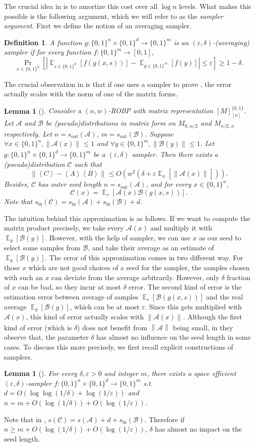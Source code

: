 \documentclass[10pt,a4paper]{article}
\newtheorem{definition}[theorem]{Definition}
\newtheorem{lemma}[theorem]{Lemma}
\DeclareMathOperator*{\Ex}{\mathbb E}
\newcommand{\ex}[2][]{\Ex_{#1}\left[#2\right]}
\newcommand{\pr}[2][]{\Pr_{#1}\left[#2\right]}
\newcommand{\abs}[1]{\left|#1\right|}
\newcommand{\inp}[1]{\left\langle#1\right\rangle}
\newcommand{\norm}[2][]{\left\|#2\right\|_{#1}}
\newcommand{\cA}{\mathcal A}
\newcommand{\cB}{\mathcal B}
\newcommand{\cC}{\mathcal C}
\newcommand{\bits}[1]{\{0,1\}^{#1}}
\newcommand{\bit}{\{0,1\}}
\newcommand{\eps}{\varepsilon}
\newcommand{\sout}[1][]{s_{\mathrm{out}#1}}
\newcommand{\si}[1][]{s_{\mathrm{in}#1}}
\begin{document}
The crucial idea in \cite{BCG18} is to amortize this cost over all $\log n$ levels. What makes this possible is the following argument, which we will refer to as the \emph{sampler argument}. First we define the notion of an averaging sampler. 
\begin{definition}
A function $g:\bits{n}\times\bits{d}\to\bits{m}$ is an $(\eps,\delta)$-(averaging) sampler if for every function $f:\bits{m}\to{[0,1]}$, $$\pr[x\in\bits{n}]{\abs{\ex[s\in\bits{d}]{f(g(x,s))}-\ex[y\in\bits{m}]{f(y)}}\le\eps}\ge 1-\delta.$$
\end{definition}
\noindent
The crucial observation in \cite{BCG18} is that if one uses a sampler to prove , the error actually scales with the norm of one of the matrix forms.
\begin{lemma}[\cite{BCG18}]\label{lemma:samp-arg}
Consider a $(n,w)$-ROBP with matrix representation $[M]_{[n]}^{\bit}$. Let $\cA$ and $\cB$ be (pseudo)distributions in matrix form on $M_{0..n/2}$ and $M_{n/2..n}$ respectively. Let $n=\sout(\cA)$, $m=\sout(\cB)$. Suppose $\forall x\in\bits{n},\norm{\cA(x)}\le 1$ and $\forall y\in\bits{m},\norm{\cB(y)}\le 1$. Let $g:\bits{n}\times \bits{d}\to\bits{m}$ be a $(\eps,\delta)$ sampler. Then there exists a (pseudo)distribution $\cC$ such that 
$$\norm{\inp{C}-\inp{A}\inp{B}}\le O\left(w^2\left(\delta+\eps \ex[x]{\norm{\cA(x)}}\right)\right).$$
Besides, $\cC$ has outer seed length $n=\sout(\cA)$, and for every $x\in\bits{n}$, $$\cC(x)=\ex[s]{\cA(x)\cB\left(g(x,s)\right)}.$$
Note that $\si(\cC)=\si(\cA)+\si(\cB)+d$.
\end{lemma}
The intuition behind this approximation is as follows. If we want to compute the matrix product precisely, we take every $\cA(x)$ and multiply it with $\ex[y]{\cB(y)}$. However, with the help of sampler, we can use $x$ as our seed to select some samples from $\cB$, and take their average as an estimate of $\ex[y]{\cB(y)}$. The error of this approximation comes in two different way. For those $x$ which are not good choices of a seed for the sampler, the samples chosen with such an $x$ can deviate from the average arbitrarily. However, only $\delta$ fraction of $x$ can be bad, so they incur at most $\delta$ error. The second kind of error is the estimation error between average of samples $\ex[s]{\cB(g(x,s))}$ and the real average $\ex[y]{\cB(y)}$, which can be at most $\eps$. Since this gets multiplied  with $\cA(x)$, this kind of error actually scales with $\norm{\cA(x)}$. Although the first kind of error (which is $\delta$) does not benefit from $\norm{\cA}$ being small, in \cite{BCG18} they observe that, the parameter $\delta$ has almost no influence on the seed length in some cases. To discuss this more precisely, we first recall explicit constructions of samplers.
\begin{lemma}[\cite{RVW01,Gol11}]
For every $\delta,\eps>0$ and integer $m$, there exists a space efficient $(\eps,\delta)$-sampler $f:\bits{n}\times\bits{d}\to\bits{m}$ s.t. $d=O(\log\log(1/\delta)+\log(1/\eps))$ and $n=m+O(\log(1/\delta))+O(\log(1/\eps))$.
\end{lemma}
Note that in , $s(\cC)=s(\cA)+d+\si(\cB)$. Therefore if $n\ge m+O(\log(1/\delta))+O(\log(1/\eps))$, $\delta$ has almost no impact on the seed length. 
\end{document}
